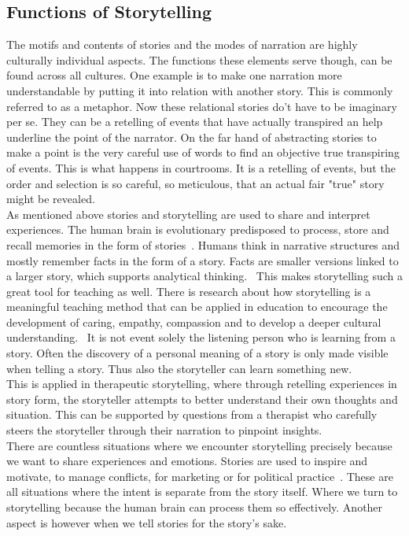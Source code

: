 \subsection{Functions of Storytelling}
The motifs and contents of stories and the modes of narration are highly culturally individual aspects. The functions these elements serve though, can be found across all cultures. One example is to make one narration more understandable by putting it into relation with another story. This is commonly referred to as a metaphor. Now these relational stories do't have to be imaginary per se. They can be a retelling of events that have actually transpired an help underline the point of the narrator. On the far hand of abstracting stories to make a point is the very careful use of words to find an objective true transpiring of events. This is what happens in courtrooms. It is a retelling of events, but the order and selection is so careful, so meticulous, that an actual fair "true" story might be revealed.~\cite{Rigney1992}\\
As mentioned above stories and storytelling are used to share and interpret experiences. The human brain is evolutionary predisposed to process, store and recall memories in the form of stories~\cite{Wyer2014}. Humans think in narrative structures and mostly remember facts in the form of a story. Facts are smaller versions linked to a larger story, which supports analytical thinking.~\cite{Connelly1990} This makes storytelling such a great tool for teaching as well. There is research about how storytelling is a meaningful teaching method that can be applied in education to encourage the development of caring, empathy, compassion and to develop a deeper cultural understanding.~\cite{Davidson2004} It is not event solely the listening person who is learning from a story. Often the discovery of a personal meaning of a story is only made visible when telling a story. Thus also the storyteller can learn something new.~\cite{Doty2003}\\
This is applied in therapeutic storytelling, where through retelling experiences in story form, the storyteller attempts to better understand their own thoughts and situation. This can be supported by questions from a therapist who carefully steers the storyteller through their narration to pinpoint insights.~\cite{Lawless2001}\\
There are countless situations where we encounter storytelling precisely because we want to share experiences and emotions. Stories are used to inspire and motivate, to manage conflicts, for marketing or for political practice~\cite{Jameson2001}. These are all situations where the intent is separate from the story itself. Where we turn to storytelling because the human brain can process them so effectively. Another aspect is however when we tell stories for the story's sake.
